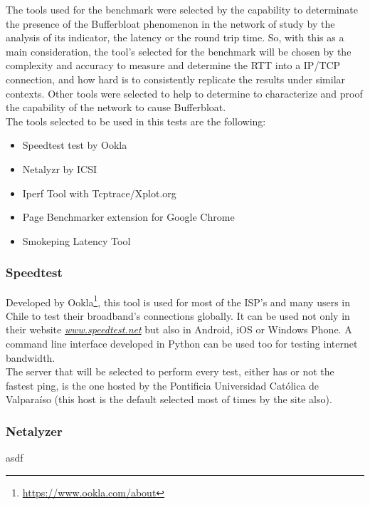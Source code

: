 The tools used for the benchmark were selected by the capability to determinate 
the presence of the Bufferbloat phenomenon in the network of study by the 
analysis of its indicator, the latency or the round trip time. So, with this as 
 a main consideration, the tool's selected for the benchmark will be
chosen by the complexity and accuracy to measure and determine the RTT into a
IP/TCP connection, and how hard is to consistently replicate the results under 
similar contexts. Other tools were selected to help to determine to 
characterize and proof the capability of the network to cause Bufferbloat.\\

The tools selected to be used in this tests are the following:

\begin{itemize}
    \item Speedtest test by Ookla
    \item Netalyzr by ICSI
    \item Iperf Tool with Tcptrace/Xplot.org
    \item Page Benchmarker extension for Google Chrome
    \item Smokeping Latency Tool
\end{itemize}

\subsubsection{Speedtest}

Developed by Ookla\footnote{\url{https://www.ookla.com/about}}, this tool is used
for most of the ISP's and many users in Chile to test their broadband's
connections globally. It can be used not only in their website 
\href{http://www.speedtest.net}{\textit{www.speedtest.net}} but also in Android,
iOS or Windows Phone. A command line interface developed in Python can be used 
too for testing internet bandwidth.\\

The server that will be selected to perform every test, either has or not the
fastest ping, is the one hosted by the Pontificia Universidad Cat\'olica de
Valpara\'iso (this host is the default selected most of times by the site also).  

\subsubsection{Netalyzer\cite{netalyzr}}

asdf

